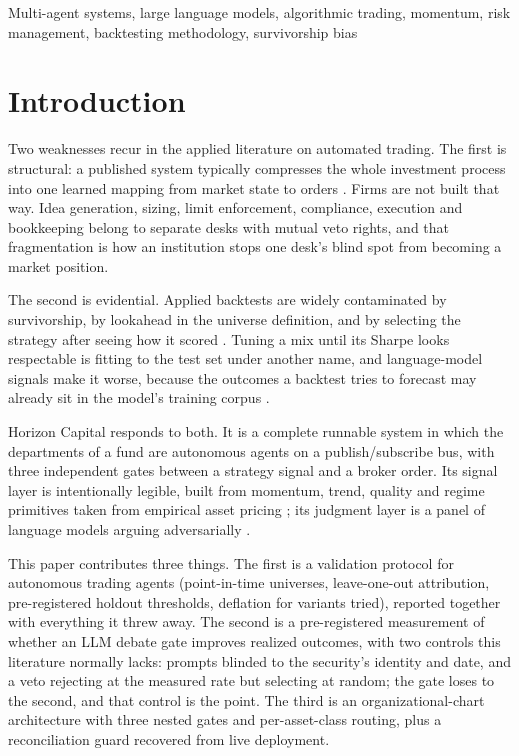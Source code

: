\documentclass[conference]{IEEEtran}
\begin{document}
\begin{IEEEkeywords}
Multi-agent systems, large language models, algorithmic trading, momentum,
risk management, backtesting methodology, survivorship bias
\end{IEEEkeywords}

\section{Introduction}

Two weaknesses recur in the applied literature on automated trading. The first
is structural: a published system typically compresses the whole investment
process into one learned mapping from market state to orders
\cite{liu2020finrl}. Firms are not built that way. Idea generation, sizing,
limit enforcement, compliance, execution and bookkeeping belong to separate
desks with mutual veto rights, and that fragmentation is how an institution
stops one desk's blind spot from becoming a market position.

The second is evidential. Applied backtests are widely contaminated by
survivorship, by lookahead in the universe definition, and by selecting the
strategy after seeing how it scored \cite{bailey2014deflated,harvey2016cross}.
Tuning a mix until its Sharpe looks respectable is fitting to the test set
under another name, and language-model signals make it worse, because the
outcomes a backtest tries to forecast may already sit in the model's training
corpus \cite{glasserman2023lookahead}.

Horizon Capital responds to both. It is a complete runnable system in which the
departments of a fund are autonomous agents on a publish/subscribe bus, with
three independent gates between a strategy signal and a broker order. Its
signal layer is intentionally legible, built from momentum, trend, quality and
regime primitives taken from empirical asset pricing
\cite{jegadeesh1993returns,faber2007tactical,asness2019qmj}; its judgment layer
is a panel of language models arguing adversarially \cite{du2023improving}.

This paper contributes three things. The first is a validation protocol for
autonomous trading agents (point-in-time universes, leave-one-out attribution,
pre-registered holdout thresholds, deflation for variants tried), reported
together with everything it threw away.
The second is a pre-registered measurement of whether an LLM debate gate
improves realized outcomes, with two controls this literature normally lacks:
prompts blinded to the security's identity and date, and a veto rejecting at
the measured rate but selecting at random; the gate loses to the second, and
that control is the point. The third is an organizational-chart architecture
with three nested gates and per-asset-class routing, plus a reconciliation
guard recovered from live deployment.
\end{document}
